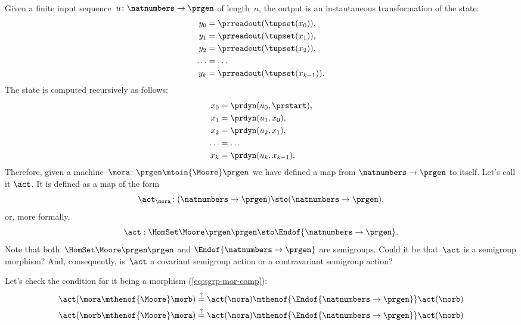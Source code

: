 \

Given a finite input sequence~$u\colon \natnumbers \to \prgen$ of length~$n$, the output is an instantaneous transformation of the state:
%
\begin{equation}
    \label{eq:actions-on-sequences-y}
    \begin{aligned}
        y_0   & = \prreadout(\tupset(x_0)), \\
        y_1   & = \prreadout(\tupset(x_1)), \\
        y_2   & = \prreadout(\tupset(x_2)), \\
        \dots & = \dots \\
        y_{k} & = \prreadout(\tupset(x_{k-1})).
    \end{aligned}
\end{equation}
%
The state is computed recursively as follows:
\begin{equation}
    \label{eq:actions-on-sequences-x}
    \begin{aligned}
        x_0   & = \prdyn(u_0, \prstart), \\
        x_1   & = \prdyn(u_1, x_0), \\
        x_2   & = \prdyn(u_2, x_1), \\
        \dots & = \dots \\
        x_{k} & = \prdyn(u_{k}, x_{k-1}).
    \end{aligned}
\end{equation}
%
Therefore, given a machine~$\mora \colon \prgen \mtoin{\Moore} \prgen$ we have defined a map from $\natnumbers \to \prgen$ to itself.
Let's call it $\act$.
It is defined as a map of the form
%
\begin{equation}
    \label{eq:actions-on-sequences-1}
    \act_{\mora}\colon  (\natnumbers \to \prgen)  \sto  (\natnumbers \to \prgen),
\end{equation}
%
or, more formally,
%
\begin{equation}
    \label{eq:actions-on-sequences-2}
    \act: \HomSet\Moore\prgen\prgen \sto \Endof {\natnumbers \to \prgen}.
\end{equation}
%
Note that both~$\HomSet\Moore\prgen\prgen$ and $\Endof {\natnumbers \to \prgen}$ are semigroups.
Could it be that~$\act$ is a semigroup morphism?
And, consequently, is~$\act$ a covariant semigroup action or a contravariant semigroup action?

Let's check the condition for it being a morphism (\cref{eq:sgrp-mor-comp}):
%
\begin{align}
    \act ( \mora \mthenof{\Moore} \morb) & \mathrel{\stackrel{?
    }{=} } \act ( \mora) \mthenof{\Endof  {\natnumbers \to \prgen}} \act(\morb) \label{eq:actions-on-sequences-left} \\
    \act ( \morb \mthenof{\Moore} \mora) & \mathrel{\stackrel{?}{=}}  \act ( \mora) \mthenof{\Endof  {\natnumbers \to \prgen}} \act(\morb) \label{eq:actions-on-sequences-right}
\end{align}

